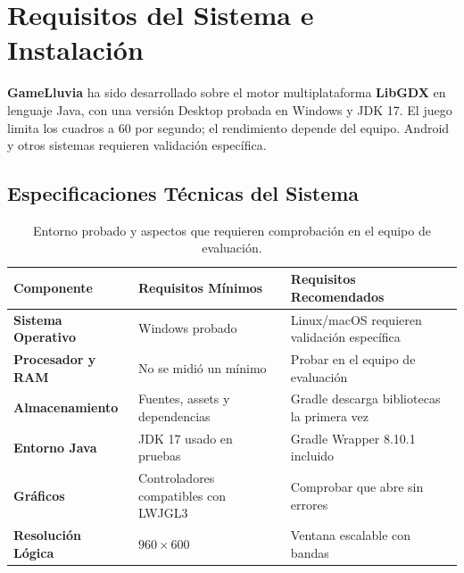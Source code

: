 \documentclass[11pt,a4paper]{article}
\begin{document}
\newpage

\section{Requisitos del Sistema e Instalación}
\label{sec:requisitos}

\textbf{GameLluvia} ha sido desarrollado sobre el motor multiplataforma \textbf{LibGDX} en lenguaje Java, con una versión Desktop probada en Windows y JDK 17. El juego limita los cuadros a 60 por segundo; el rendimiento depende del equipo. Android y otros sistemas requieren validación específica.

\subsection*{Especificaciones Técnicas del Sistema}

\begin{table}[h!]
\centering
\begin{tcolorbox}[enhanced, colback=white, colframe=NavyMedium, arc=3mm, boxrule=1pt, width=\textwidth, left=4pt, right=4pt, top=4pt, bottom=4pt]
\begin{tabularx}{\textwidth}{lXX}
\toprule
\textbf{Componente} & \textbf{Requisitos Mínimos} & \textbf{Requisitos Recomendados} \\
\midrule
\textbf{Sistema Operativo} & Windows probado & Linux/macOS requieren validación específica \\
\textbf{Procesador y RAM} & No se midió un mínimo & Probar en el equipo de evaluación \\
\textbf{Almacenamiento} & Fuentes, assets y dependencias & Gradle descarga bibliotecas la primera vez \\
\textbf{Entorno Java} & JDK 17 usado en pruebas & Gradle Wrapper 8.10.1 incluido \\
\textbf{Gráficos} & Controladores compatibles con LWJGL3 & Comprobar que abre sin errores \\
\textbf{Resolución Lógica} & $960 \times 600$ & Ventana escalable con bandas \\
\bottomrule
\end{tabularx}
\end{tcolorbox}
\caption{Entorno probado y aspectos que requieren comprobación en el equipo de evaluación.}
\end{table}
\end{document}
